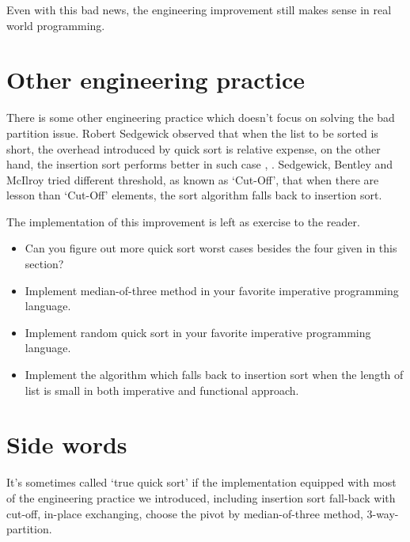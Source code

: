 \documentclass[UTF8]{article}
\begin{document}
Even with this bad news, the engineering improvement still makes sense in real world programming.

\section{Other engineering practice}
There is some other engineering practice which doesn't focus on solving the bad partition issue.
Robert Sedgewick observed that when the list to be sorted is short, the overhead introduced by
quick sort is relative expense, on the other hand, the insertion sort performs better in such
case \cite{pearls}, \cite{3-way-part}. Sedgewick, Bentley and McIlroy tried different
threshold, as known as `Cut-Off', that when
there are lesson than `Cut-Off' elements, the sort algorithm falls back to insertion sort.

\begin{algorithmic}[1]
    \State {}
  \Else
    \State {}
  \EndIf
\EndProcedure
\end{algorithmic}

The implementation of this improvement is left as exercise to the reader.

\begin{Exercise}
\begin{itemize}
\item Can you figure out more quick sort worst cases besides the four given in this section?
\item Implement median-of-three method in your favorite imperative programming language.
\item Implement random quick sort in your favorite imperative programming language.
\item Implement the algorithm which falls back to insertion sort when the length of list is
small in both imperative and functional approach.
\end{itemize}
\end{Exercise}

\section{Side words}
It's sometimes called `true quick sort' if the implementation equipped with most of
the engineering practice we introduced, including insertion sort fall-back with cut-off,
in-place exchanging, choose the pivot by median-of-three method, 3-way-partition.
\end{document}

